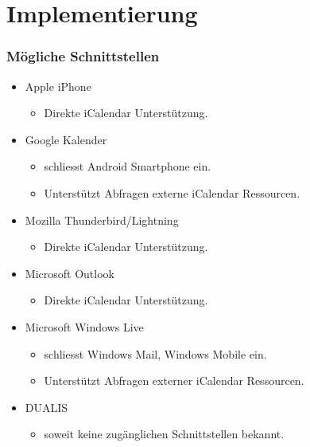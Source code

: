 \documentclass{beamer}
\begin{document}
\section{Implementierung}
\begin{frame}\frametitle{Mögliche Schnittstellen}
  \begin{itemize}
  \item Apple iPhone
    \begin{itemize}
    \item Direkte iCalendar Unterstützung.
    \end{itemize}
  \item Google Kalender
    \begin{itemize}
    \item schliesst Android Smartphone ein.
    \item Unterstützt Abfragen externe iCalendar Ressourcen.
    \end{itemize}
  \item Mozilla Thunderbird/Lightning
    \begin{itemize}
    \item Direkte iCalendar Unterstützung.
    \end{itemize}
  \item Microsoft Outlook
    \begin{itemize}
    \item Direkte iCalendar Unterstützung.
    \end{itemize}
  \item Microsoft Windows Live
    \begin{itemize}
    \item schliesst Windows Mail, Windows Mobile ein.
    \item Unterstützt Abfragen externer iCalendar Ressourcen.
    \end{itemize}
    \pause
  \item \textsc{DUALIS}
    \begin{itemize}
    \item soweit keine zugänglichen Schnittstellen bekannt.
    \end{itemize}
  \end{itemize}
\end{frame}
\end{document}
